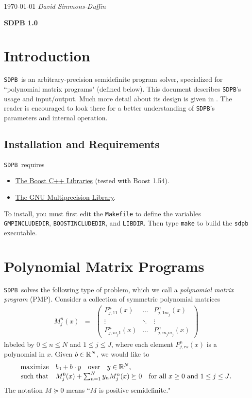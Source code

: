 \documentclass[12pt]{article}
\numberwithin{equation}{section}
\renewcommand{\be}{\begin{eqnarray}}
\renewcommand{\ee}{\end{eqnarray}}
\newcommand\SDPB{\texttt{SDPB}}
\begin{document}
\noindent \today
\hfill {\em David Simmons-Duffin}
{\Large
\begin{center}
{\bf SDPB 1.0 \\\vspace{.1in}}
\end{center}
}
\tableofcontents

\section{Introduction}

\SDPB\ is an arbitrary-precision semidefinite program solver, specialized for ``polynomial matrix programs" (defined below).  This document describes \SDPB's usage and input/output.  Much more detail about its design is given in \cite{DSD}. The reader is encouraged to look there for a better understanding of \SDPB's parameters and internal operation.

\subsection{Installation and Requirements}

\SDPB\ requires

\begin{itemize}
\item \href{http://www.boost.org/}{The Boost C++ Libraries} (tested with Boost 1.54).

\item \href{https://gmplib.org/}{The GNU Multiprecision Library}.
\end{itemize}

To install, you must first edit the \texttt{Makefile} to define the variables
\texttt{GMPINCLUDEDIR}, \texttt{BOOSTINCLUDEDIR}, and \texttt{LIBDIR}. Then type \texttt{make} to
build the \texttt{sdpb} executable.

\section{Polynomial Matrix Programs}
\label{sec:PMP}

\SDPB\ solves the following type of problem, which we call a {\it polynomial matrix program} (PMP).  Consider a collection of symmetric polynomial matrices
\be
M_j^n(x) &=& \begin{pmatrix}
P_{j,11}^{n}(x) & \dots & P_{j,1m_j}^{n}(x)\\
\vdots & \ddots & \vdots\\
P_{j,m_j1}^{n}(x) & \dots & P^{n}_{j,m_jm_j}(x)
\end{pmatrix}
\ee
labeled by $0 \leq n \leq N$ and $1 \leq j \leq J$,
where each element $P_{j,rs}^{n}(x)$ is a polynomial in $x$.  
Given $b\in \mathbb{R}^N$, we would like to
\be
\label{eq:PMPconstraint}
\begin{array}{ll}
\textrm{maximize} & b_0+b\.y\quad\textrm{over}\quad y \in \R^N,\\
\textrm{such that} & M^0_j(x)+\sum_{n=1}^{N} y_n M^n_j(x) \succeq 0 \quad \textrm{for all $x\geq 0$ and $1 \leq j \leq J$}.
\end{array}
\ee
The notation $M\succeq 0$ means ``$M$ is positive semidefinite."
\end{document}
